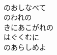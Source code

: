 \documentclass[10pt,b5j]{tarticle} %
\begin{document}
\begin{enumerate}
\begin{minipage}[c]{\blocksize}
    \end{minipage}
    \begin{minipage}[c]{\blocksize}
        
        \vspace{\linespace}
        \item~\\
        のおしなべて\\
        のわれの\\
        きにあこがれの\\
        はぐくむに\\
        のあらしめよ
    
    \end{minipage}
\end{enumerate} %
\end{document}
